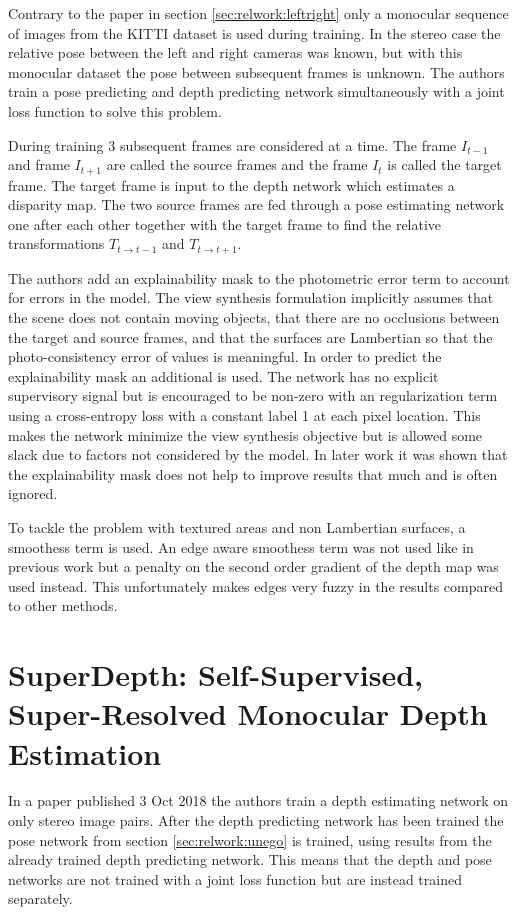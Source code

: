 Contrary to the paper in section \ref{sec:relwork:leftright} only a monocular sequence of images from the KITTI dataset is used during training. In the stereo case the relative pose between the left and right cameras was known, but with this monocular dataset the pose between subsequent frames is unknown. The authors train a pose predicting and depth predicting network simultaneously with a joint loss function to solve this problem.

During training 3 subsequent frames are considered at a time. The frame $I_{t-1}$ and frame $I_{t+1}$ are called the source frames and the frame $I_t$ is called the target frame. The target frame is input to the depth network which estimates a disparity map. The two source frames are fed through a pose estimating network one after each other together with the target frame to find the relative transformations $T_{t	\rightarrow t-1}$ and $T_{t	\rightarrow t+1}$.

The authors add an explainability mask to the photometric error term to account for errors in the model. The view synthesis formulation implicitly assumes that the scene does not contain moving objects, that there are no occlusions between the target and source frames, and that the surfaces are Lambertian so that the photo-consistency error of \abbrRGB values is meaningful. In order to predict the explainability mask an additional \abbrCNN is used. The network has no explicit supervisory signal but is encouraged to be non-zero with an regularization term using a cross-entropy loss with a constant label 1 at each pixel location. This makes the network minimize the view synthesis objective but is allowed some slack due to factors not considered by the model. In later work it was shown that the explainability mask does not help to improve results that much and is often ignored.

To tackle the problem with textured areas and non Lambertian surfaces, a smoothess term is used. An edge aware smoothess term was not used like in previous work\cite{leftright} but a penalty on the second order gradient of the depth map was used instead. This unfortunately makes edges very fuzzy in the results compared to other methods.

\section{SuperDepth: Self-Supervised, Super-Resolved Monocular Depth Estimation}

In a paper\cite{superdepth} published 3 Oct 2018 the authors train a depth estimating network on only stereo image pairs. After the depth predicting network has been trained the pose network from section \ref{sec:relwork:unego} is trained, using results from the already trained depth predicting network. This means that the depth and pose networks are not trained with a joint loss function but are instead trained separately.

